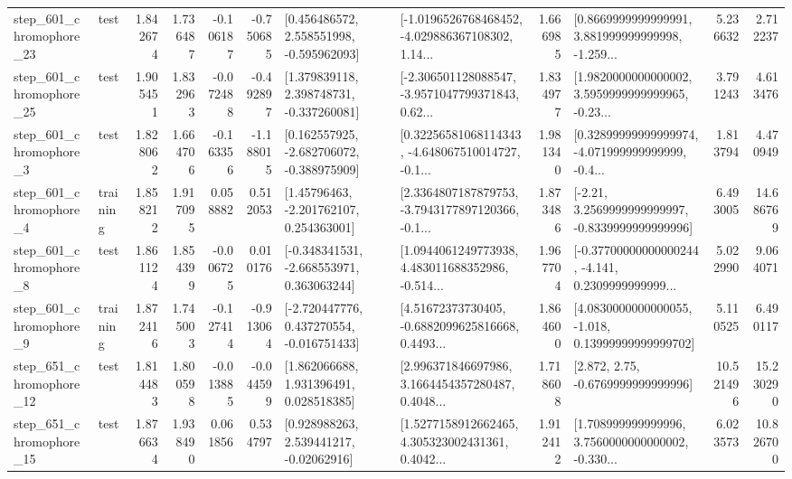 \begin{tabular}{llrrrrllrlrr}
  step\_601\_chromophore\_23 &      test &      1.842674 &    1.736487 &     -0.106187 & -0.750685 &    [0.456486572, 2.558551998, -0.595962093] &  [-1.0196526768468452, -4.029886367108302, 1.14... &       1.666985 &  [0.8669999999999991, 3.881999999999998, -1.259... &            5.236632 &          2.712237 \\
  step\_601\_chromophore\_25 &      test &      1.905451 &    1.832963 &     -0.072488 & -0.492897 &    [1.379839118, 2.398748731, -0.337260081] &  [-2.306501128088547, -3.9571047799371843, 0.62... &       1.834977 &  [1.9820000000000002, 3.5959999999999965, -0.23... &            3.791243 &          4.613476 \\
   step\_601\_chromophore\_3 &      test &      1.828062 &    1.664706 &     -0.163356 & -1.188015 &   [0.162557925, -2.682706072, -0.388975909] &  [0.32256581068114343, -4.648067510014727, -0.1... &       1.981340 &  [0.32899999999999974, -4.071999999999999, -0.4... &            1.813794 &          4.470949 \\
   step\_601\_chromophore\_4 &  training &      1.858212 &    1.917095 &      0.058882 &  0.512053 &     [1.45796463, -2.201762107, 0.254363001] &  [2.3364807187879753, -3.7943177897120366, -0.1... &       1.873486 &   [-2.21, 3.2569999999999997, -0.8339999999999996] &            6.493005 &         14.686769 \\
   step\_601\_chromophore\_8 &      test &      1.861124 &    1.854399 &     -0.006725 &  0.010176 &   [-0.348341531, -2.668553971, 0.363063244] &  [1.0944061249773938, 4.483011688352986, -0.514... &       1.967704 &  [-0.37700000000000244, -4.141, 0.2309999999999... &            5.022990 &          9.064071 \\
   step\_601\_chromophore\_9 &  training &      1.872416 &    1.745003 &     -0.127414 & -0.913064 &   [-2.720447776, 0.437270554, -0.016751433] &  [4.51672373730405, -0.6882099625816668, 0.4493... &       1.864600 &  [4.0830000000000055, -1.018, 0.13999999999999702] &            5.110525 &          6.490117 \\
  step\_651\_chromophore\_12 &      test &      1.814483 &    1.800598 &     -0.013885 & -0.044599 &     [1.862066688, 1.931396491, 0.028518385] &  [2.996371846697986, 3.1664454357280487, 0.4048... &       1.718608 &                 [2.872, 2.75, -0.6769999999999996] &           10.521496 &         15.230290 \\
  step\_651\_chromophore\_15 &      test &      1.876634 &    1.938490 &      0.061856 &  0.534797 &     [0.928988263, 2.539441217, -0.02062916] &  [1.5277158912662465, 4.305323002431361, 0.4042... &       1.912412 &  [1.708999999999996, 3.7560000000000002, -0.330... &            6.023573 &         10.826700 \\

\end{tabular}
